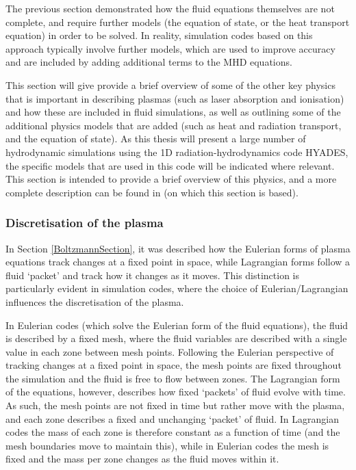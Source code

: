 The previous section demonstrated how the fluid equations themselves are not complete, and require further models (the equation of state, or the heat transport equation) in order to be solved. In reality, simulation codes based on this approach typically involve further models, which are used to improve accuracy and are included by adding additional terms to the MHD equations. 

This section will give provide a brief overview of some of the other key physics that is important in describing plasmas (such as laser absorption and ionisation) and how these are included in fluid simulations, as well as outlining some of the additional physics models that are added (such as heat and radiation transport, and the equation of state). As this thesis will  present a large number of hydrodynamic simulations using the 1D radiation-hydrodynamics code HYADES, the specific models that are used in this code will be indicated where relevant. This section is intended to provide a brief overview of this physics, and a more complete description can be found in \cite{Colvin2013} (on which this section is based).

\subsubsection{Discretisation of the plasma}
In Section \ref{BoltzmannSection}, it was described how the Eulerian forms of plasma equations track changes at a fixed point in space, while Lagrangian forms follow a fluid `packet' and track how it changes as it moves. This distinction is particularly evident in simulation codes, where the choice of Eulerian/Lagrangian influences the discretisation of the plasma.

In Eulerian codes (which solve the Eulerian form of the fluid equations), the fluid is described by a fixed mesh, where the fluid variables are described with a single value in each zone between mesh points. Following the Eulerian perspective of tracking changes at a fixed point in space, the mesh points are fixed throughout the simulation and the fluid is free to flow between zones. The Lagrangian form of the equations, however, describes how fixed `packets' of fluid evolve with time. As such, the mesh points are not fixed in time but rather move with the plasma, and each zone describes a fixed and unchanging `packet' of fluid. In Lagrangian codes the mass of each zone is therefore constant as a function of time (and the mesh boundaries move to maintain this), while in Eulerian codes the mesh is fixed and the mass per zone changes as the fluid moves within it.

